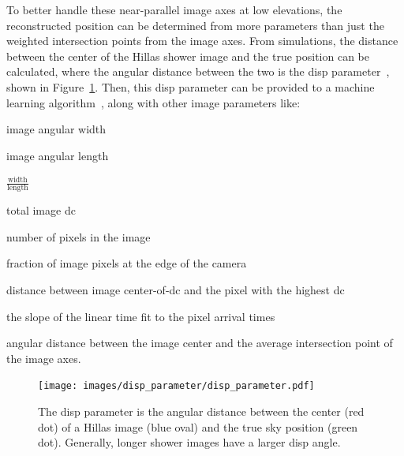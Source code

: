     To better handle these near-parallel image axes at low elevations, the reconstructed position can be determined from more parameters than just the weighted intersection points from the image axes.
    From simulations, the distance between the center of the Hillas shower image and the true position can be calculated, where the angular distance between the two is the disp parameter~\cite{Senturk:2011}, shown in Figure~\ref{fig:dispdiagram}.
    Then, this disp parameter can be provided to a machine learning algorithm~\cite{Beilicke2012NIM}, along with other image parameters like:
    \begin{description}[noitemsep]
      \item [width:] image angular width
      \item [length:] image angular length
      \item [wol:] $\frac{\textrm{width}}{\textrm{length}}$
      \item [size:] total image dc
      \item [ntubes:] number of pixels in the image
      \item [loss:] fraction of image pixels at the edge of the camera
      \item [asym:] distance between image center-of-dc and the pixel with the highest dc
      \item [tgrad:] the slope of the linear time fit to the pixel arrival times
      \item [cross:] angular distance between the image center and the average intersection point of the image axes.
    \end{description}


    \begin{figure}[!t]
      \centering
      \texttt{[image: images/disp\_parameter/disp\_parameter.pdf]}
      \caption[Angular Reconstruction Disp]{
        The disp parameter is the angular distance between the center (red dot) of a Hillas image (blue oval) and the true sky position (green dot).
        Generally, longer shower images have a larger disp angle.
      }
      \label{fig:dispdiagram}
    \end{figure}

